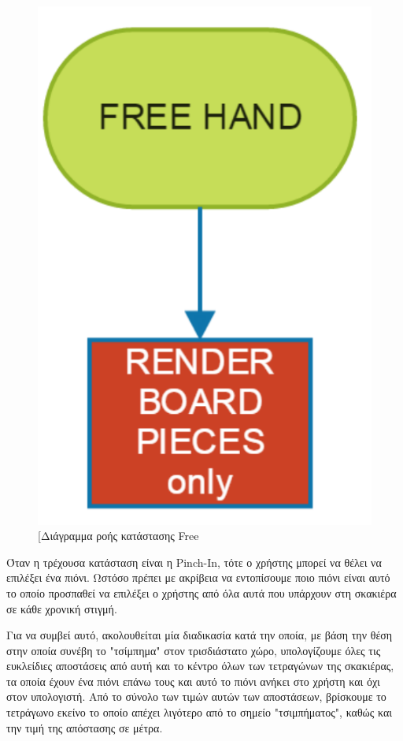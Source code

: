 \begin{figure}[H]
    \centering
    \includegraphics[scale=0.35, angle=0]{Files/Figures/free_hand.pdf}
    \caption[Διάγραμμα ροής κατάστασης Free]{[Διάγραμμα ροής κατάστασης Free}
    \label{fig:free}
\end{figure}



Όταν η τρέχουσα κατάσταση είναι η Pinch-In, τότε ο χρήστης μπορεί να θέλει να επιλέξει ένα πιόνι. Ωστόσο πρέπει με ακρίβεια να εντοπίσουμε ποιο πιόνι είναι αυτό το οποίο προσπαθεί να επιλέξει ο χρήστης από όλα αυτά που υπάρχουν στη σκακιέρα σε κάθε χρονική στιγμή. 

Για να συμβεί αυτό, ακολουθείται μία διαδικασία κατά την οποία, με βάση την θέση στην οποία συνέβη το "τσίμπημα" στον τρισδιάστατο χώρο, υπολογίζουμε όλες τις ευκλείδιες αποστάσεις από αυτή και το κέντρο όλων των τετραγώνων της σκακιέρας, τα οποία έχουν ένα πιόνι επάνω τους και αυτό το πιόνι ανήκει στο χρήστη και όχι στον υπολογιστή. Από το σύνολο των τιμών αυτών των αποστάσεων, βρίσκουμε το τετράγωνο εκείνο το οποίο απέχει λιγότερο από το σημείο "τσιμπήματος", καθώς και την τιμή της απόστασης σε μέτρα. 



